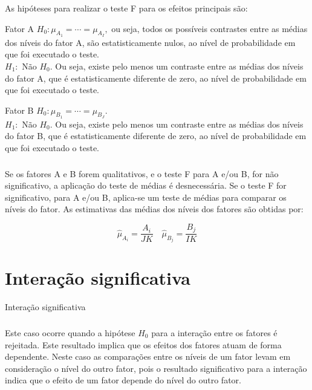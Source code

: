 \documentclass[14pt,aspectratio=1610]{beamer}
\begin{document}
\begin{frame}{}
\frametitle{}
As hipóteses para realizar o teste F para os efeitos principais são:
\begin{block}{Fator A}
\justifying
$H_{0}:\mu_{A_{1}}=\cdots=\mu_{A_{I}},$ ou seja, todos os possíveis contrastes entre as médias dos níveis do fator A, são estatisticamente nulos, ao nível de probabilidade em que foi executado o teste.\\
$H_{1}:$ Não $H_{0}.$ Ou seja, existe pelo menos um contraste entre as médias dos
níveis do fator A, que é estatisticamente diferente de zero, ao nível de
probabilidade em que foi executado o teste.
\end{block}
\pause
\begin{block}{Fator B}
\justifying
$H_{0}:\mu_{B_{1}}=\cdots=\mu_{B_{J}}.$\\
$H_{1}:$ Não $H_{0}.$ Ou seja, existe pelo menos um contraste entre as médias dos
níveis do fator B, que é estatisticamente diferente de zero, ao nível de
probabilidade em que foi executado o teste.
\end{block}
\end{frame}

\begin{frame}{}
\frametitle{}
\begin{block}{}
\justifying
Se os fatores A e B forem qualitativos, e o teste F para A e/ou B, for não
significativo, a aplicação do teste de médias é desnecessária. Se o teste F for
significativo, para A e/ou B, aplica-se um teste de médias para comparar os
níveis do fator. As estimativas das médias dos níveis dos fatores são obtidas
por:

$$\hat{\mu}_{A_{i}}=\dfrac{A_{i}}{JK}\quad \hat{\mu}_{B_{j}}=\dfrac{B_{j}}{IK}$$

\end{block}
\end{frame}

\section{Interação significativa}
\begin{frame}{Interação significativa}
\frametitle{}
\begin{block}{}
\justifying
Este caso ocorre quando a hipótese $H_{0}$ para a interação entre os fatores
é rejeitada. Este resultado implica que os efeitos dos fatores atuam de forma
dependente. Neste caso as comparações entre os níveis de um fator levam em
consideração o nível do outro fator, pois o resultado significativo para a
interação indica que o efeito de um fator depende do nível do outro fator.
\end{block}
\end{frame}
\end{document}
